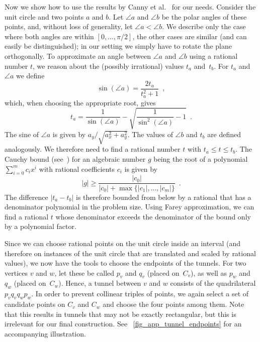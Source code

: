\documentclass[11pt,a4paper]{article}
\begin{document}
Now we show how to use the results by Canny et al.~\cite{canny} for our needs.
Consider the unit circle and two points $a$ and $b$.
Let $\angle a$ and $\angle b$ be the polar angles of these points, and, without loss of generality, let $\angle a < \angle b$.
We describe only the case where both angles are within $[0, \dots, \pi/2]$, the other cases are similar (and can easily be distinguished);
in our setting we simply have to rotate the plane orthogonally.
To approximate an angle between $\angle a$ and $\angle b$ using a rational number $t$, we reason about the (possibly irrational) values $t_a$ and~$t_b$.
For $t_a$ and $\angle a$ we define
\[ \sin(\angle a) = \frac{2t_a}{t_a^2 + 1} \enspace ,\]
which, when choosing the appropriate root, gives
\[ t_a = \frac{1}{\sin(\angle a)} - \sqrt{\frac{1}{\sin^2(\angle a)} - 1} \enspace .\]
The sine of $\angle a$ is given by $a_y/\sqrt{a_x^2 + a_y^2}$.
The values of $\angle b$ and $t_b$ are defined analogously.
We therefore need to find a rational number $t$ with $t_a \leq t \leq t_b$.
The Cauchy bound (see~\cite{yap}) for an algebraic number $g$ being the root of a polynomial $\sum_{i=0}^m c_i x^i$ with rational coefficients $c_i$ is given by
\[ |g| \geq \frac{|c_0|}{|c_0| + \max\{ |c_1|,\dots,|c_m| \}} \enspace .\]
The difference $|t_a - t_b|$ is therefore bounded from below by a rational that has a denominator polynomial in the problem size.
{Using Farey approximation, we can find a rational $t$ whose denominator exceeds the denominator of the bound only by a polynomial factor.}


Since we can choose rational points on the unit circle inside an interval (and therefore on instances of the unit circle that are translated and scaled by rational values), we now have the tools to choose the endpoints of the tunnels.
For two vertices $v$ and $w$, let these be called $p_v$ and $q_v$ (placed on~$C_v$), as well as $p_w$ and $q_w$ (placed on~$C_w$).
Hence, a tunnel between $v$ and $w$ consists of the quadrilateral $p_v q_v q_w p_w$.
In order to prevent collinear triples of points, we again select a set of candidate points on $C_v$ and $C_w$ and choose the four points among them.
Note that this results in tunnels that may not be exactly rectangular, but this is irrelevant for our final construction.
See \figurename~\ref{fig_app_tunnel_endpoints} for an accompanying illustration.
\end{document}
